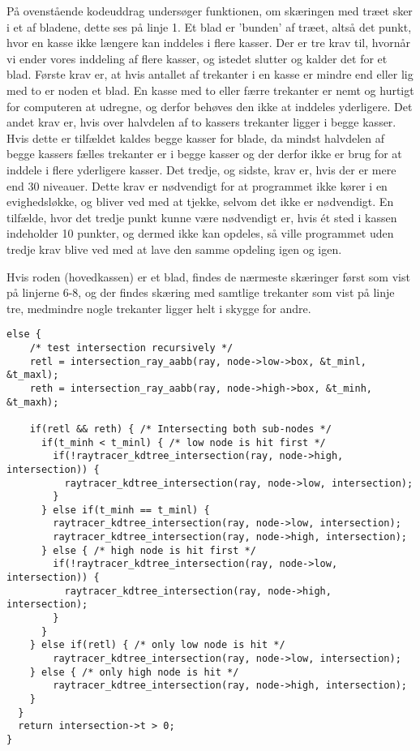 På ovenstående kodeuddrag undersøger funktionen, om skæringen med træet sker i et af bladene, dette ses på linje 1. Et blad er 'bunden' af træet, altså det punkt, hvor en kasse ikke længere kan inddeles i flere kasser. Der er tre krav til, hvornår vi ender vores inddeling af flere kasser, og istedet slutter og kalder det for et blad. Første krav er, at hvis antallet af trekanter i en kasse er mindre end eller lig med to er noden et blad. En kasse med to eller færre trekanter er nemt og hurtigt for computeren at udregne, og derfor behøves den ikke at inddeles yderligere. Det andet krav er, hvis over halvdelen af to kassers trekanter ligger i begge kasser. Hvis dette er tilfældet kaldes begge kasser for blade, da mindst halvdelen af begge kassers fælles trekanter er i begge kasser og der derfor ikke er brug for at inddele i flere yderligere kasser. Det tredje, og sidste, krav er, hvis der er mere end 30 niveauer. Dette krav er nødvendigt for at programmet ikke kører i en evighedsløkke, og bliver ved med at tjekke, selvom det ikke er nødvendigt. En tilfælde, hvor det tredje punkt kunne være nødvendigt er, hvis ét sted i kassen indeholder 10 punkter, og dermed ikke kan opdeles, så ville programmet uden tredje krav blive ved med at lave den samme opdeling igen og igen.


Hvis roden (hovedkassen) er et blad, findes de nærmeste skæringer først som vist på linjerne 6-8, og der findes skæring med samtlige trekanter som vist på linje tre, medmindre nogle trekanter ligger helt i skygge for andre. 

\begin{lstlisting}[style=Cstyle, caption=Fortsættelse af uddraget fra funktionen raytracer\_kdtree\_intersection]
else {
    /* test intersection recursively */
    retl = intersection_ray_aabb(ray, node->low->box, &t_minl, &t_maxl);
    reth = intersection_ray_aabb(ray, node->high->box, &t_minh, &t_maxh);

    if(retl && reth) { /* Intersecting both sub-nodes */
      if(t_minh < t_minl) { /* low node is hit first */
        if(!raytracer_kdtree_intersection(ray, node->high, intersection)) {
          raytracer_kdtree_intersection(ray, node->low, intersection);
        }
      } else if(t_minh == t_minl) {
        raytracer_kdtree_intersection(ray, node->low, intersection);
        raytracer_kdtree_intersection(ray, node->high, intersection);
      } else { /* high node is hit first */
        if(!raytracer_kdtree_intersection(ray, node->low, intersection)) {
          raytracer_kdtree_intersection(ray, node->high, intersection);
        }
      }
    } else if(retl) { /* only low node is hit */
        raytracer_kdtree_intersection(ray, node->low, intersection);
    } else { /* only high node is hit */
        raytracer_kdtree_intersection(ray, node->high, intersection);
    }
  }
  return intersection->t > 0;
}
\end{lstlisting}

